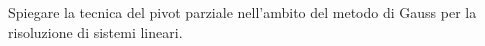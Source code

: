 Spiegare la tecnica del pivot parziale nell'ambito del metodo di 
Gauss per la risoluzione di sistemi lineari.

